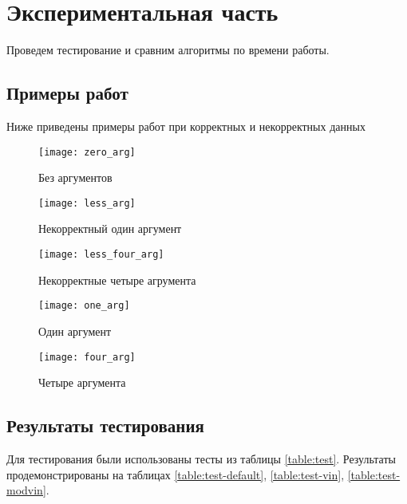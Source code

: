 \newpage
\section{Экспериментальная часть}

Проведем тестирование и сравним алгоритмы по времени работы.

\subsection{Примеры работ}

Ниже приведены примеры работ при корректных и некорректных данных

\begin{figure}[H]
    \centering
    \texttt{[image: zero\_arg]}
    \caption{Без аргументов}
    \label{img:zero-arg}
\end{figure}

\begin{figure}[H]
    \centering
    \texttt{[image: less\_arg]}
    \caption{Некорректный один аргумент}
    \label{img:less-arg}
\end{figure}

\begin{figure}[H]
    \centering
    \texttt{[image: less\_four\_arg]}
    \caption{Некорректные четыре агрумента}
    \label{img:less-four-arg}
\end{figure}

\begin{figure}[H]
    \centering
    \texttt{[image: one\_arg]}
    \caption{Один аргумент}
    \label{img:one-arg}
\end{figure}

\begin{figure}[H]
    \centering
    \texttt{[image: four\_arg]}
    \caption{Четыре аргумента}
    \label{img:four-arg}
\end{figure}

\subsection{Результаты тестирования}

Для тестирования были использованы тесты из таблицы \ref{table:test}.
Результаты продемонстрированы на таблицах \ref{table:test-default},
\ref{table:test-vin}, \ref{table:test-modvin}.

